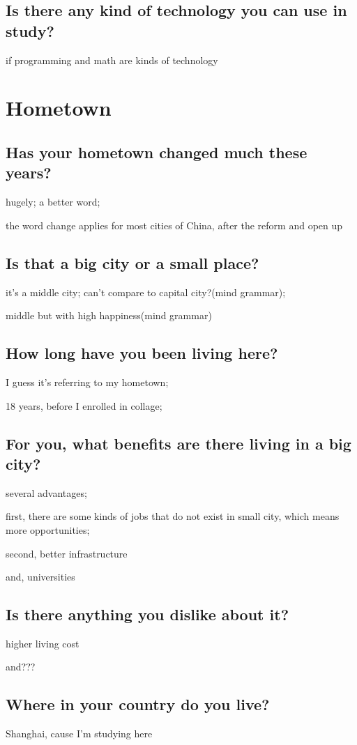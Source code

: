 \documentclass[conference]{IEEEtran}
\begin{document}
\subsection{Is there any kind of technology you can use in study?}
if programming and math are kinds of technology

\section{Hometown}

\subsection{Has your hometown changed much these years?}
hugely; a better word;

the word change applies for most cities of China, after the reform and open up

\subsection{Is that a big city or a small place?}
it's a middle city;
can't compare to capital city?(mind grammar);

middle but with high happiness(mind grammar)

\subsection{How long have you been living here?}
I guess it's referring to my hometown;

18 years, before I enrolled in collage;

\subsection{For you, what benefits are there living in a big city?}
several advantages;

first, there are some kinds of jobs that do not exist in small city, which means more opportunities;

second, better infrastructure

and, universities

\subsection{Is there anything you dislike about it?}
higher living cost

and???

\subsection{Where in your country do you live?}
Shanghai, cause I'm studying here
\end{document}
